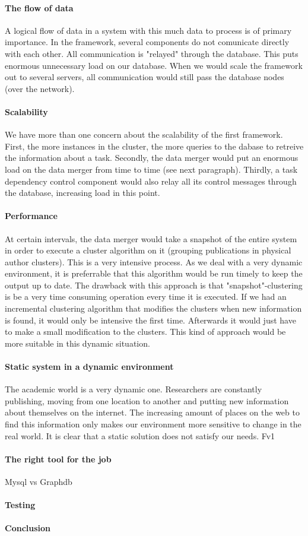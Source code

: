 \paragraph{The flow of data} A logical flow of data in a system with this much data to process is of primary importance. In the framework, several components do not comunicate directly with each other. All communication is "relayed" through the database. This puts enormous unnecessary load on our database. When we would scale the framework out to several servers, all communication would still pass the database nodes (over the network).

\paragraph{Scalability} We have more than one concern about the scalability of the first framework. First, the more instances in the cluster, the more queries to the dabase to retreive the information about a task. Secondly, the data merger would put an enormous load on the data merger from time to time (see next paragraph). Thirdly, a task dependency control component would also relay all its control messages through the database, increasing load in this point.

\paragraph{Performance} At certain intervals, the data merger would take a snapshot of the entire system in order to execute a cluster algorithm on it (grouping publications in physical author clusters). This is a very intensive process. As we deal with a very dynamic environment, it is preferrable that this algorithm would be run timely to keep the output up to date. The drawback with this approach is that "snapshot"-clustering is be a very time consuming operation every time it is executed. If we had an incremental clustering algorithm that modifies the clusters when new information is found, it would only be intensive the first time. Afterwards it would just have to make a small modification to the clusters. This kind of approach would be more suitable in this dynamic situation.

\paragraph{Static system in a dynamic environment} The academic world is a very dynamic one. Researchers are constantly publishing, moving from one location to another and putting new information about themselves on the internet. The increasing amount of places on the web to find this information only makes our environment more sensitive to change in the real world. It is clear that a static solution does not satisfy our needs. Fv1

\paragraph{The right tool for the job} Mysql vs Graphdb

\paragraph{Testing}

\paragraph{Conclusion}